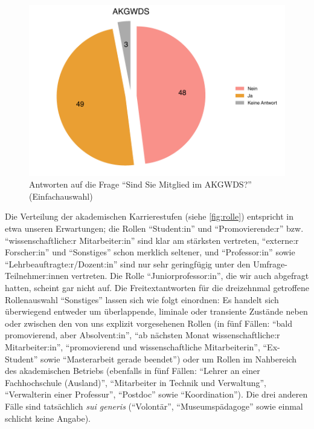 \documentclass{scrartcl}
\begin{document}
\begin{figure}[ht]
   \includegraphics[width=1\textwidth]{akgwds.pdf}
   \caption{Antworten auf die Frage \enquote{Sind Sie Mitglied im AKGWDS?} (Einfachauswahl)}
   \label{fig:akgwds}
\end{figure}

Die Verteilung der akademischen Karrierestufen (siehe \autoref{fig:rolle}) entspricht in etwa unseren Erwartungen; die Rollen \enquote{Student:in} und \enquote{Promovierende:r} bzw. \enquote{wissenschaftliche:r Mitarbeiter:in} sind klar am stärksten vertreten, \enquote{externe:r Forscher:in} und \enquote{Sonstiges} schon merklich seltener, und \enquote{Professor:in} sowie \enquote{Lehrbeauftragte:r/Dozent:in} sind nur sehr geringfügig unter den Umfrage-Teilnehmer:innen vertreten.
Die Rolle \enquote{Juniorprofessor:in}, die wir auch abgefragt hatten, scheint gar nicht auf.
Die Freitextantworten für die dreizehnmal getroffene Rollenauswahl \enquote{Sonstiges} lassen sich wie folgt einordnen:
Es handelt sich überwiegend entweder um überlappende, liminale oder transiente Zustände neben oder zwischen den von uns explizit vorgesehenen Rollen (in fünf Fällen: \enquote{bald promovierend, aber Absolvent:in}, \enquote{ab nächsten Monat wissenschaftliche:r Mitarbeiter:in}, \enquote{promovierend und wissenschaftliche Mitarbeiterin}, \enquote{Ex-Student} sowie \enquote{Masterarbeit gerade beendet}) oder um Rollen im Nahbereich des akademischen Betriebs (ebenfalls in fünf Fällen: \enquote{Lehrer an einer Fachhochschule (Ausland)}, \enquote{Mitarbeiter in Technik und Verwaltung}, \enquote{Verwalterin einer Professur}, \enquote{Postdoc} sowie \enquote{Koordination}).
Die drei anderen Fälle sind tatsächlich \textit{sui generis} (\enquote{Volontär}, \enquote{Museumspädagoge} sowie einmal schlicht keine Angabe).
\end{document}
